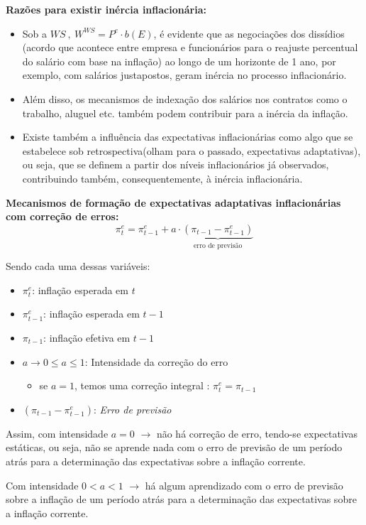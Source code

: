 \documentclass[a4paper,12pt]{article}[abntex2]
\begin{document}
\textbf{Razões para existir inércia inflacionária:}\begin{itemize}
    \item Sob a \(WS \ ,\ W^{WS}=P^e\cdot b(E)\), é evidente que as negociações dos dissídios (acordo que acontece entre empresa e funcionários para o reajuste percentual do salário com base na inflação) ao longo de um horizonte de 1 ano, por exemplo, com salários justapostos, geram inércia no processo inflacionário. 
    \item Além disso, os mecanismos de indexação dos salários nos contratos como o trabalho, aluguel etc. também podem contribuir para a inércia da inflação. 
    \item Existe também a influência das expectativas inflacionárias como algo que se estabelece sob retrospectiva(olham para o passado, expectativas adaptativas),  ou  seja,  que  se  definem  a  partir  dos  níveis  inflacionários  já  observados, contribuindo também, consequentemente, à inércia inflacionária. 
\end{itemize}

\textbf{Mecanismos de formação de expectativas adaptativas inflacionárias com correção de erros:}
\[
\pi_t^e=\pi_{t-1}^e+a\cdot \underbrace{(\pi_{t-1}-\pi_{t-1}^e)}_\text{erro de previsão}
\]

Sendo cada uma dessas variáveis:\begin{itemize}
    \item $\pi_t^e$: inflação esperada em $t$
    \item $\pi_{t-1}^e$: inflação esperada em $t-1$
    \item $\pi_{t-1}$: inflação efetiva em $t-1$
    \item $a \to 0 \leq a \leq 1$: Intensidade da correção do erro\begin{itemize}
        \item se \(a=1\), temos uma correção integral : \(\pi_t^e=\pi_{t-1}\)
    \end{itemize}
    \item $(\pi_{t-1} - \pi_{t-1}^e)$: \textit{Erro de previsão}
\end{itemize}

Assim, com intensidade $a = 0$ $\rightarrow$ não há correção de erro, tendo-se expectativas estáticas, ou seja, não se aprende nada com o erro de previsão de um período atrás para a determinação das expectativas sobre a inflação corrente.

Com intensidade $0 < a < 1$ $\rightarrow$ há algum aprendizado com o erro de previsão sobre a inflação de um período atrás para a determinação das expectativas sobre a inflação corrente.
\end{document}
